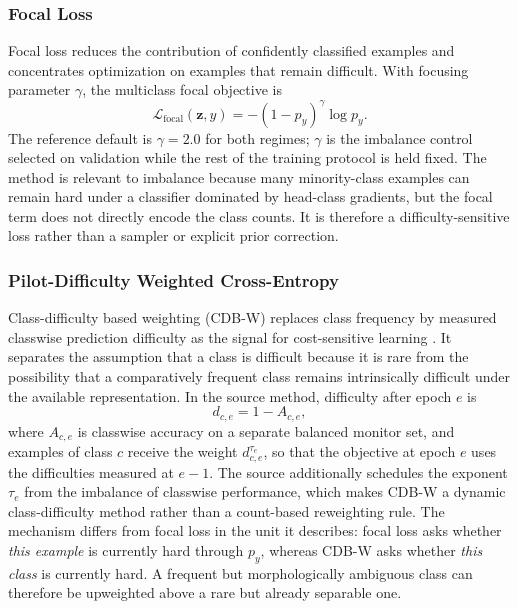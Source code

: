 \documentclass[11pt]{article}
\begin{document}
\subsubsection{Focal Loss}
Focal loss reduces the contribution of confidently classified examples and concentrates optimization on examples that remain difficult. With focusing parameter $\gamma$, the multiclass focal objective is
\begin{equation}
  \mathcal{L}_{\mathrm{focal}}(\mathbf{z},y) =
  -(1-p_y)^{\gamma}\log p_y.
  \label{eq:focal}
\end{equation}
The reference default is $\gamma=\num{2.0}$ for both regimes; $\gamma$ is the imbalance control selected on validation while the rest of the training protocol is held fixed. The method is relevant to imbalance because many minority-class examples can remain hard under a classifier dominated by head-class gradients, but the focal term does not directly encode the class counts. It is therefore a difficulty-sensitive loss rather than a sampler or explicit prior correction.

\subsubsection{Pilot-Difficulty Weighted Cross-Entropy}
\label{sec:pdw-ce}
Class-difficulty based weighting (CDB-W) replaces class frequency by measured classwise prediction difficulty as the signal for cost-sensitive learning \citep{sinha2022classDifficulty}. It separates the assumption that a class is difficult because it is rare from the possibility that a comparatively frequent class remains intrinsically difficult under the available representation. In the source method, difficulty after epoch $e$ is
\begin{equation}
  d_{c,e}=1-A_{c,e},
  \label{eq:cdb-difficulty}
\end{equation}
\noindent where $A_{c,e}$ is classwise accuracy on a separate balanced monitor set, and examples of class $c$ receive the weight $d_{c,e}^{\tau_e}$, so that the objective at epoch $e$ uses the difficulties measured at $e-1$. The source additionally schedules the exponent $\tau_e$ from the imbalance of classwise performance, which makes CDB-W a dynamic class-difficulty method rather than a count-based reweighting rule. The mechanism differs from focal loss in the unit it describes: focal loss asks whether \emph{this example} is currently hard through $p_y$, whereas CDB-W asks whether \emph{this class} is currently hard. A frequent but morphologically ambiguous class can therefore be upweighted above a rare but already separable one.
\end{document}

